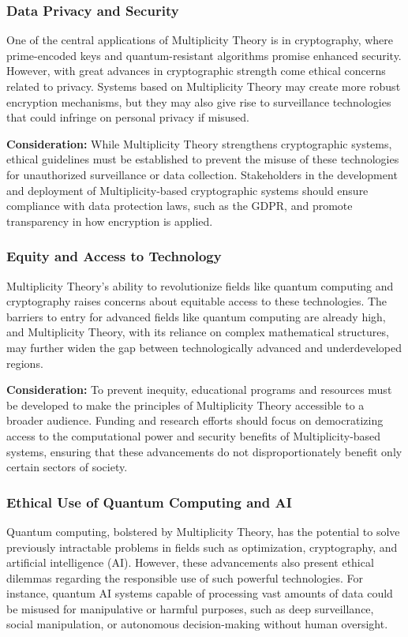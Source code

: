 \documentclass[%
 preprint, linenumbers,
 amsmath,amssymb,
 aps, physrev,
]{revtex4-2}
\begin{document}
\subsubsection{Data Privacy and Security}
One of the central applications of Multiplicity Theory is in cryptography, where prime-encoded keys and quantum-resistant algorithms promise enhanced security. However, with great advances in cryptographic strength come ethical concerns related to privacy. Systems based on Multiplicity Theory may create more robust encryption mechanisms, but they may also give rise to surveillance technologies that could infringe on personal privacy if misused.

\textbf{Consideration:} While Multiplicity Theory strengthens cryptographic systems, ethical guidelines must be established to prevent the misuse of these technologies for unauthorized surveillance or data collection. Stakeholders in the development and deployment of Multiplicity-based cryptographic systems should ensure compliance with data protection laws, such as the GDPR, and promote transparency in how encryption is applied.

\subsubsection{Equity and Access to Technology}
Multiplicity Theory's ability to revolutionize fields like quantum computing and cryptography raises concerns about equitable access to these technologies. The barriers to entry for advanced fields like quantum computing are already high, and Multiplicity Theory, with its reliance on complex mathematical structures, may further widen the gap between technologically advanced and underdeveloped regions.

\textbf{Consideration:} To prevent inequity, educational programs and resources must be developed to make the principles of Multiplicity Theory accessible to a broader audience. Funding and research efforts should focus on democratizing access to the computational power and security benefits of Multiplicity-based systems, ensuring that these advancements do not disproportionately benefit only certain sectors of society.

\subsubsection{Ethical Use of Quantum Computing and AI}
Quantum computing, bolstered by Multiplicity Theory, has the potential to solve previously intractable problems in fields such as optimization, cryptography, and artificial intelligence (AI). However, these advancements also present ethical dilemmas regarding the responsible use of such powerful technologies. For instance, quantum AI systems capable of processing vast amounts of data could be misused for manipulative or harmful purposes, such as deep surveillance, social manipulation, or autonomous decision-making without human oversight.
\end{document}
